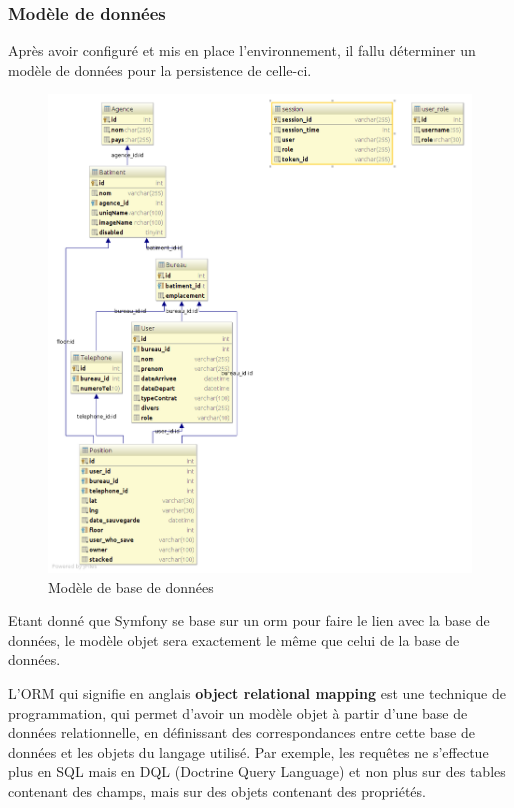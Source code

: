 \documentclass{report}
\begin{document}
\subsubsection{Modèle de données}
Après avoir configuré et mis en place l'environnement, il fallu déterminer un modèle de données pour la persistence de celle-ci. 
\begin{figure}[h!]
	\centering
	\includegraphics[width=1\textwidth]{assets/diagram.png}
	\caption{Modèle de base de données}
\end{figure}

Etant donné que Symfony se base sur un \gls{orm} pour faire le lien avec la base de données, le modèle objet sera exactement le même que celui de la base de données. 





\newpage





L'ORM qui signifie en anglais \textbf{object relational mapping} est une technique de programmation, qui permet d'avoir un modèle objet à partir d'une base de données relationnelle, en définissant des correspondances entre cette base de données et les objets du langage utilisé. Par exemple, les requêtes ne s'effectue plus en SQL mais en DQL (Doctrine Query Language) et non plus sur des tables contenant des champs, mais sur des objets contenant des propriétés.
\end{document}
